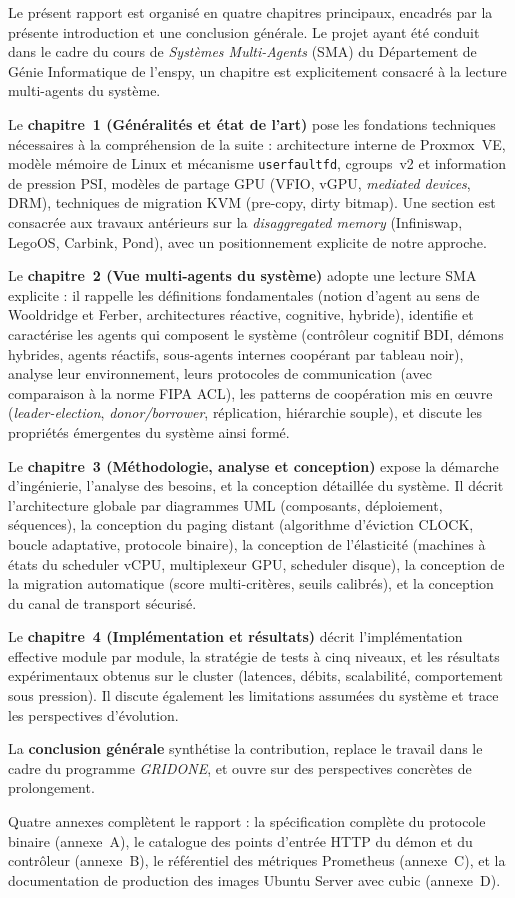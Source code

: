 Le présent rapport est organisé en quatre chapitres principaux, encadrés par la présente introduction et une conclusion générale. Le projet ayant été conduit dans le cadre du cours de \emph{Systèmes Multi-Agents} (SMA) du Département de Génie Informatique de l'\acrshort{enspy}, un chapitre est explicitement consacré à la lecture multi-agents du système.

Le \textbf{chapitre~1 (Généralités et état de l'art)} pose les fondations techniques nécessaires à la compréhension de la suite : architecture interne de Proxmox~VE, modèle mémoire de Linux et mécanisme \texttt{userfaultfd}, cgroups~v2 et information de pression PSI, modèles de partage GPU (VFIO, vGPU, \emph{mediated devices}, DRM), techniques de migration KVM (pre-copy, dirty bitmap). Une section est consacrée aux travaux antérieurs sur la \emph{disaggregated memory} (Infiniswap, LegoOS, Carbink, Pond), avec un positionnement explicite de notre approche.

Le \textbf{chapitre~2 (Vue multi-agents du système)} adopte une lecture SMA explicite : il rappelle les définitions fondamentales (notion d'agent au sens de Wooldridge et Ferber, architectures réactive, cognitive, hybride), identifie et caractérise les agents qui composent le système (contrôleur cognitif BDI, démons hybrides, agents réactifs, sous-agents internes coopérant par tableau noir), analyse leur environnement, leurs protocoles de communication (avec comparaison à la norme FIPA ACL), les patterns de coopération mis en œuvre (\emph{leader-election}, \emph{donor/borrower}, réplication, hiérarchie souple), et discute les propriétés émergentes du système ainsi formé.

Le \textbf{chapitre~3 (Méthodologie, analyse et conception)} expose la démarche d'ingénierie, l'analyse des besoins, et la conception détaillée du système. Il décrit l'architecture globale par diagrammes UML (composants, déploiement, séquences), la conception du paging distant (algorithme d'éviction CLOCK, boucle adaptative, protocole binaire), la conception de l'élasticité (machines à états du scheduler vCPU, multiplexeur GPU, scheduler disque), la conception de la migration automatique (score multi-critères, seuils calibrés), et la conception du canal de transport sécurisé.

Le \textbf{chapitre~4 (Implémentation et résultats)} décrit l'implémentation effective module par module, la stratégie de tests à cinq niveaux, et les résultats expérimentaux obtenus sur le cluster (latences, débits, scalabilité, comportement sous pression). Il discute également les limitations assumées du système et trace les perspectives d'évolution.

La \textbf{conclusion générale} synthétise la contribution, replace le travail dans le cadre du programme \emph{GRIDONE}, et ouvre sur des perspectives concrètes de prolongement.

Quatre annexes complètent le rapport : la spécification complète du protocole binaire (annexe~A), le catalogue des points d'entrée HTTP du démon et du contrôleur (annexe~B), le référentiel des métriques Prometheus (annexe~C), et la documentation de production des images Ubuntu Server avec \acrshort{cubic} (annexe~D).
